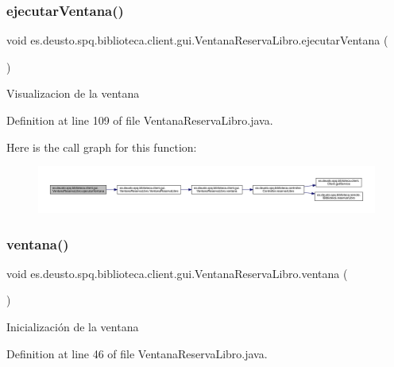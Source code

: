 \subsubsection{\texorpdfstring{ejecutar\+Ventana()}{ejecutarVentana()}}
{\footnotesize\ttfamily void es.\+deusto.\+spq.\+biblioteca.\+client.\+gui.\+Ventana\+Reserva\+Libro.\+ejecutar\+Ventana (\begin{DoxyParamCaption}{ }\end{DoxyParamCaption})}

Visualizacion de la ventana 

Definition at line 109 of file Ventana\+Reserva\+Libro.\+java.

Here is the call graph for this function\+:
\nopagebreak
\begin{figure}[H]
\begin{center}
\leavevmode
\includegraphics[width=350pt]{classes_1_1deusto_1_1spq_1_1biblioteca_1_1client_1_1gui_1_1_ventana_reserva_libro_aed223a49195d685d15baf23d7bdd8469_cgraph}
\end{center}
\end{figure}
\mbox{\label{classes_1_1deusto_1_1spq_1_1biblioteca_1_1client_1_1gui_1_1_ventana_reserva_libro_a91e2a0b1beb4353db52c2b3b8d8a8d1a}} 
\subsubsection{\texorpdfstring{ventana()}{ventana()}}
{\footnotesize\ttfamily void es.\+deusto.\+spq.\+biblioteca.\+client.\+gui.\+Ventana\+Reserva\+Libro.\+ventana (\begin{DoxyParamCaption}{ }\end{DoxyParamCaption})}

Inicialización de la ventana 

Definition at line 46 of file Ventana\+Reserva\+Libro.\+java.

